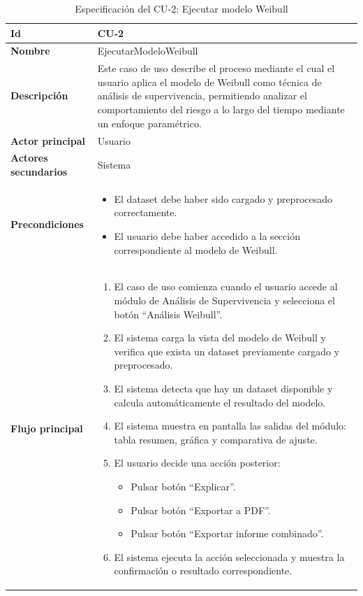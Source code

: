     \begin{longtable}{|p{4cm}|p{10cm}|}
\caption{Especificación del CU-2: Ejecutar modelo Weibull}
\label{tab:esp_cu2}\\
\hline
\textbf{Id} & CU-2 \\ \hline
\textbf{Nombre} & EjecutarModeloWeibull \\ \hline

\textbf{Descripción} & 
Este caso de uso describe el proceso mediante el cual el usuario aplica el modelo de Weibull como técnica de análisis de supervivencia, permitiendo analizar el comportamiento del riesgo a lo largo del tiempo mediante un enfoque paramétrico. \\ \hline

\textbf{Actor principal} & Usuario \\ \hline
\textbf{Actores secundarios} & Sistema \\ \hline

\textbf{Precondiciones} & 
\begin{itemize}
    \item El dataset debe haber sido cargado y preprocesado correctamente.
    \item El usuario debe haber accedido a la sección correspondiente al modelo de Weibull.
\end{itemize} \\ \hline

\textbf{Flujo principal} & 
\begin{enumerate}
    \item El caso de uso comienza cuando el usuario accede al módulo de Análisis de Supervivencia y selecciona el botón ``Análisis Weibull''.
    \item El sistema carga la vista del modelo de Weibull y verifica que exista un dataset previamente cargado y preprocesado.
    \item El sistema detecta que hay un dataset disponible y calcula automáticamente el resultado del modelo.
    \item El sistema muestra en pantalla las salidas del módulo: tabla resumen, gráfica y comparativa de ajuste.
    \item El usuario decide una acción posterior:
    \begin{itemize}
        \item Pulsar botón ``Explicar''.
        \item Pulsar botón ``Exportar a PDF''.
        \item Pulsar botón ``Exportar informe combinado''.
    \end{itemize}
    \item El sistema ejecuta la acción seleccionada y muestra la confirmación o resultado correspondiente.
\end{enumerate} \\ \hline


\end{longtable}
